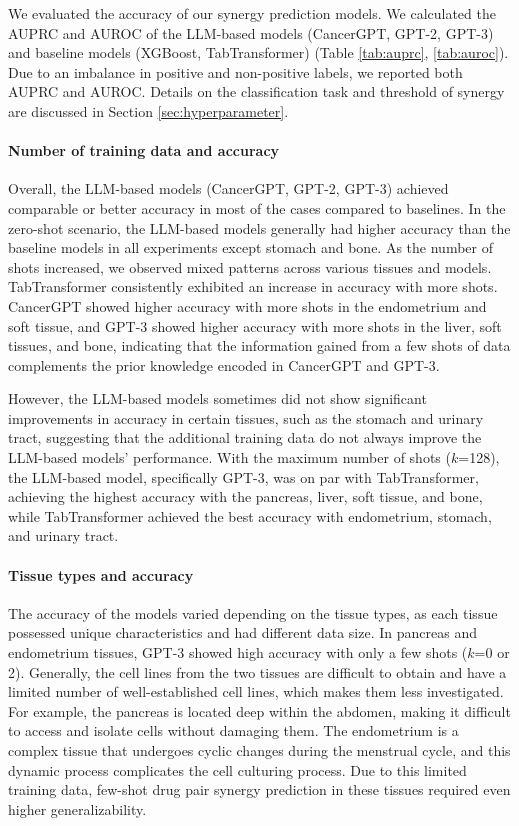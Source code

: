 {We evaluated the accuracy of our synergy prediction models. We calculated the AUPRC and AUROC of the LLM-based models (CancerGPT, GPT-2, GPT-3) and baseline models (XGBoost, TabTransformer) (Table \ref{tab:auprc}, \ref{tab:auroc}). Due to an imbalance in positive and non-positive labels, we reported both AUPRC and AUROC. Details on the classification task and threshold of synergy are discussed in Section \ref{sec:hyperparameter}. 

\paragraph{Number of training data and accuracy}

Overall, the LLM-based models (CancerGPT, GPT-2, GPT-3) achieved comparable or better accuracy in most of the cases compared to baselines. In the zero-shot scenario, the LLM-based models generally had higher accuracy than the baseline models in all experiments except stomach and bone. As the number of shots increased, we observed mixed patterns across various tissues and models. TabTransformer consistently exhibited an increase in accuracy with more shots. CancerGPT showed higher accuracy with more shots in the endometrium and soft tissue, and GPT-3 showed higher accuracy with more shots in the liver, soft tissues, and bone, indicating that the information gained from a few shots of data complements the prior knowledge encoded in CancerGPT and GPT-3. 

However, the LLM-based models sometimes did not show significant improvements in accuracy in certain tissues, such as the stomach and urinary tract, suggesting that the additional training data do not always improve the LLM-based models' performance. 
With the maximum number of shots ($k$=128), the LLM-based model, specifically GPT-3, was on par with TabTransformer, achieving the highest accuracy with the pancreas, liver, soft tissue, and bone, while TabTransformer achieved the best accuracy with endometrium, stomach, and urinary tract.

\paragraph{Tissue types and accuracy}
The accuracy of the models varied depending on the tissue types, as each tissue possessed unique characteristics and had different data size. In pancreas and endometrium tissues, GPT-3 showed high accuracy with only a few shots ($k$=0 or 2). Generally, the cell lines from the two tissues are difficult to obtain and have a limited number of well-established cell lines, which makes them less investigated. For example, the pancreas is located deep within the abdomen, making it difficult to access and isolate cells without damaging them. The endometrium is a complex tissue that undergoes cyclic changes during the menstrual cycle, and this dynamic process complicates the cell culturing process. Due to this limited training data, few-shot drug pair synergy prediction in these tissues required even higher generalizability.

}
